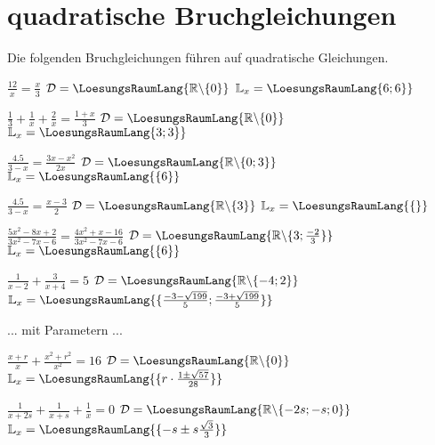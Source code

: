 \platzFuerBerechnungenBisEndeSeite{}

\section{quadratische Bruchgleichungen}
Die folgenden Bruchgleichungen führen auf quadratische Gleichungen.


\begin{bbwAufgabenBlock}
\item $\frac{12}x = \frac{x}3$ \hspace{10mm}   $\mathcal{D}= \LoesungsRaumLang{\mathbb{R}\backslash\{0\}}$  $\mathbb{L}_x = \LoesungsRaumLang{\-6; 6\}}$
\item $\frac13 + \frac1x + \frac2x = \frac{1+x}3$ \hspace{10mm}   $\mathcal{D}= \LoesungsRaumLang{\mathbb{R}\backslash\{0\}}$  $\mathbb{L}_x = \LoesungsRaumLang{\-3; 3\}}$
\item $\frac{4.5}{3-x} = \frac{3x-x^2}{2x}$ \hspace{10mm}   $\mathcal{D}= \LoesungsRaumLang{\mathbb{R}\backslash\{0;3\}}$  $\mathbb{L}_x = \LoesungsRaumLang{\{6\}}$\noTRAINER{\newpage}
\item $\frac{4.5}{3-x} = \frac{x-3}{2}$ \hspace{10mm}   $\mathcal{D}= \LoesungsRaumLang{\mathbb{R}\backslash\{3\}}$  $\mathbb{L}_x = \LoesungsRaumLang{\{\}}$
\item $\frac{5x^2-8x+2}{3x^2-7x-6}=\frac{4x^2+x-16}{3x^2-7x-6}$ \hspace{10mm}   $\mathcal{D}= \LoesungsRaumLang{\mathbb{R}\backslash\{3;\frac{-2}3\}}$  $\mathbb{L}_x = \LoesungsRaumLang{\{6\}}$
\item $\frac1{x-2} + \frac3{x+4} = 5$ \hspace{10mm}         $\mathcal{D}= \LoesungsRaumLang{\mathbb{R}\backslash\{-4;2\}}$          $\mathbb{L}_x = \LoesungsRaumLang{\{\frac{-3-\sqrt{199}}{5};\frac{-3+\sqrt{199}}{5} \}}$

\end{bbwAufgabenBlock}

\platzFuerBerechnungenBisEndeSeite{}



... mit Parametern ...


\begin{bbwAufgabenBlock}
\item $\frac{x+r}x + \frac{x^2+r^2}{x^2} = 16$ \hspace{10mm}         $\mathcal{D}= \LoesungsRaumLang{\mathbb{R}\backslash\{0\}}$          $\mathbb{L}_x = \LoesungsRaumLang{\{r\cdot{}\frac{1\pm\sqrt{57}}{28} \}}$
\item $\frac1{x+2s}+ \frac1{x+s} + \frac1{x}=0$ \hspace{10mm}
$\mathcal{D}= \LoesungsRaumLang{\mathbb{R}\backslash\{-2s;-s;0\}}$
$\mathbb{L}_x = \LoesungsRaumLang{\{-s\pm s\frac{\sqrt{3}}{3} \}}$

\end{bbwAufgabenBlock}


